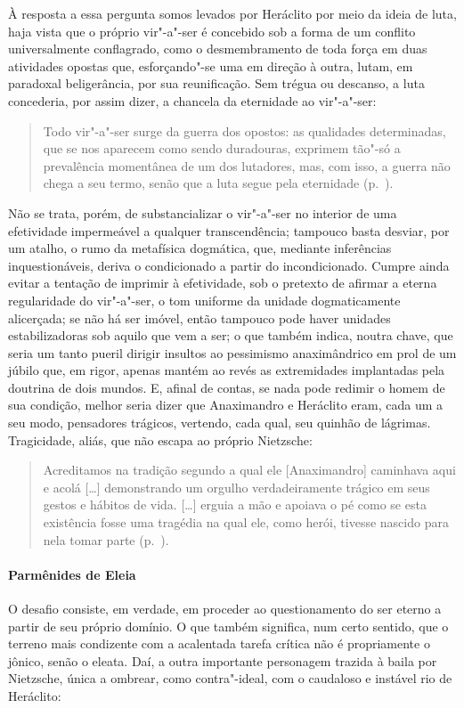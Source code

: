 À resposta a essa pergunta somos levados por Heráclito por meio da ideia de
luta, haja vista que o próprio vir"-a"-ser é concebido sob a forma de um
conflito universalmente conflagrado, como o desmembramento de toda força em
duas atividades opostas que, esforçando"-se uma em direção à outra, lutam, em
paradoxal beligerância, por sua reunificação. Sem trégua ou descanso, a luta
concederia, por assim dizer, a chancela da eternidade ao vir"-a"-ser: 

\begin{quote} 
Todo vir"-a"-ser surge da guerra dos opostos: as qualidades
 determinadas, que se nos aparecem como sendo duradouras, exprimem tão"-só a
 prevalência momentânea de um dos lutadores, mas, com isso, a guerra não
 chega a seu termo, senão que a luta segue pela eternidade 
 (p.~\pageref{sereterno}).
\end{quote} 

Não se trata, porém, de substancializar o vir"-a"-ser no interior de uma
efetividade impermeável a qualquer transcendência; tampouco basta desviar,
por um atalho, o rumo da metafísica dogmática, que, mediante inferências
inquestionáveis, deriva o condicionado a partir do incondicionado. Cumpre
ainda evitar a tentação de imprimir à efetividade, sob o pretexto de afirmar
a eterna regularidade do vir"-a"-ser, o tom uniforme da unidade
dogmaticamente alicerçada; se não há ser imóvel, então tampouco pode haver
unidades estabilizadoras sob aquilo que vem a ser; o que também indica,
noutra chave, que seria um tanto pueril dirigir insultos ao pessimismo
anaximândrico em prol de um júbilo que, em rigor, apenas mantém ao revés as
extremidades implantadas pela doutrina de dois mundos. E, afinal de contas,
se nada pode redimir o homem de sua condição, melhor seria dizer que
Anaximandro e Heráclito eram, cada um a seu modo, pensadores trágicos,
vertendo, cada qual, seu quinhão de lágrimas. Tragicidade, aliás, que não
escapa ao próprio Nietzsche:

\begin{quote} 
Acreditamos na tradição segundo a qual ele
 [Anaximandro] caminhava aqui e acolá [\ldots] demonstrando um orgulho
 verdadeiramente trágico em seus gestos e hábitos de vida. [\ldots] erguia a
 mão e apoiava o pé como se esta existência fosse uma tragédia na qual ele,
 como herói, tivesse nascido para nela tomar parte (p.~\pageref{acreditamosnatradicao}).
\end{quote} 

\paragraph{Parmênides de Eleia} O desafio consiste, em verdade, em proceder ao
 questionamento do ser eterno a partir de seu próprio domínio. O que também
 significa, num certo sentido, que o terreno mais condizente com a acalentada
 tarefa crítica não é propriamente o jônico, senão o eleata. Daí, a outra
 importante personagem trazida à baila por Nietzsche, única a ombrear, como
 contra"-ideal, com o caudaloso e instável rio de Heráclito:

